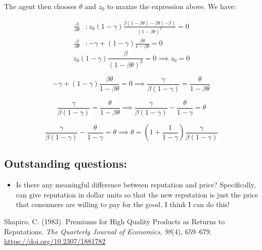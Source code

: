 \documentclass[
]{article}
\providecommand{\tightlist}{%
  \setlength{\itemsep}{0pt}\setlength{\parskip}{0pt}}
\begin{document}
The agent then chooses \(\theta\) and \(z_0\) to maxize the expression
above. We have:

\[
\begin{align*}
\frac{\partial}{\partial\theta}&\colon z_0(1-\gamma)\frac{\beta(1-\beta\theta)-\beta\theta(-\beta)}{(1-\beta\theta)^2}=0\\
\frac{\partial}{\partial\theta}&\colon -\gamma+(1-\gamma)\frac{\beta\theta}{1-\beta\theta}=0
\end{align*}
\] \[
z_0(1-\gamma)\frac{\beta}{(1-\beta\theta)^2}=0\implies z_0=0
\]

\[
-\gamma+(1-\gamma)\frac{\beta\theta}{1-\beta\theta}=0\implies\frac{\gamma}{\beta(1-\gamma)}=\frac{\theta}{1-\beta\theta}
\]

\[
\frac{\gamma}{\beta(1-\gamma)}=\frac{\theta}{1-\beta\theta}\implies\frac{\gamma}{\beta(1-\gamma)}-\frac{\theta}{1-\gamma}=\theta
\]

\[
\frac{\gamma}{\beta(1-\gamma)}-\frac{\theta}{1-\gamma}=\theta\implies\theta=\left(1+\frac{1}{1-\gamma}\right)\frac{\gamma}{\beta(1-\gamma)}
\]

\hypertarget{outstanding-questions}{%
\subsection{Outstanding questions:}\label{outstanding-questions}}

\begin{itemize}
\tightlist
\item
  Is there any meaningful difference between reputation and price?
  Specifically, can give reputation in dollar units so that the new
  reputation is just the price that consumers are willing to pay for the
  good. I think I can do this!
\end{itemize}

\hypertarget{refs}{}
\leavevmode\hypertarget{ref-shapiroPremiumsHighQuality1983}{}%
Shapiro, C. (1983). Premiums for High Quality Products as Returns to
Reputations. \emph{The Quarterly Journal of Economics}, \emph{98}(4),
659--679. \url{https://doi.org/10.2307/1881782}
\end{document}
